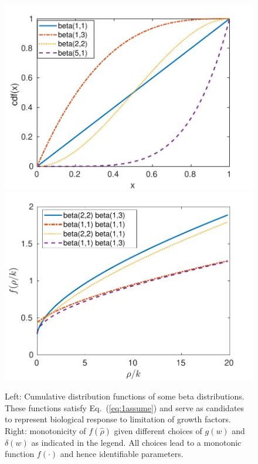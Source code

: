 \documentclass{aims}
\numberwithin{equation}{section}
\begin{document}
\begin{figure}
\begin{center}
\includegraphics[scale=0.5]{plots/frhok/betas-new}
\includegraphics[scale=0.5]{plots/frhok/frhok-new}
\end{center}
\caption{Left: Cumulative distribution functions of some beta distributions. These
functions satisfy Eq.~(\ref{eq:1assume})  and serve as candidates to represent
biological response to limitation of growth factors. Right:
monotonicity of $f(\hat\rho)$ given different choices of $g(w)$ and $\delta(w)$ as
indicated in the legend. All choices lead to a monotonic function $f(\cdot)$ and hence
identifiable parameters.}
\label{fig:beta26f}
\end{figure}
\end{document}
